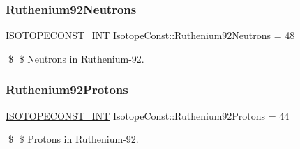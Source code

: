 \subsubsection{\texorpdfstring{Ruthenium92\+Neutrons}{Ruthenium92Neutrons}}
{\footnotesize\ttfamily \mbox{\hyperlink{group___isotope_const-_macros_ga5f18360b3e99483a35c32d789e62621c}{I\+S\+O\+T\+O\+P\+E\+C\+O\+N\+S\+T\+\_\+\+I\+NT}} Isotope\+Const\+::\+Ruthenium92\+Neutrons = 48}

\$ \$ Neutrons in Ruthenium-\/92. \mbox{\label{group___isotope_const-_ruthenium-_ru92_gab0b11ac781d2f92df0f86e9d61bfaae0}} 
\subsubsection{\texorpdfstring{Ruthenium92\+Protons}{Ruthenium92Protons}}
{\footnotesize\ttfamily \mbox{\hyperlink{group___isotope_const-_macros_ga5f18360b3e99483a35c32d789e62621c}{I\+S\+O\+T\+O\+P\+E\+C\+O\+N\+S\+T\+\_\+\+I\+NT}} Isotope\+Const\+::\+Ruthenium92\+Protons = 44}

\$ \$ Protons in Ruthenium-\/92. 